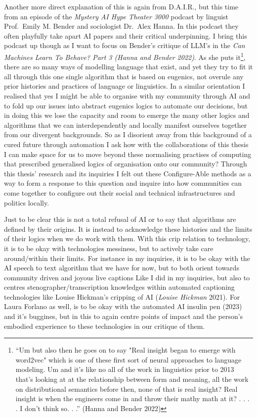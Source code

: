 Another more direct explanation of this is again from D.A.I.R., but this
time from an episode of the \emph{Mystery AI Hype Theater 3000} podcast
by linguist Prof.~Emily M. Bender and sociologist Dr.~Alex Hanna. In
this podcast they often playfully take apart AI papers and their
critical underpinning. I bring this podcast up though as I want to focus
on Bender's critique of LLM's in the \emph{Can Machines Learn To Behave?
Part 3 (Hanna and Bender 2022)}. As she puts it\footnote{``Um but also
  then he goes on to say "Real insight began to emerge with word2vec"
  which is one of these first sort of neural approaches to language
  modeling. Um and it's like no all of the work in linguistics prior to
  2013 that's looking at at the relationship between form and meaning,
  all the work on distributional semantics before then, none of that is
  real insight? Real insight is when the engineers come in and throw
  their mathy math at it? . . . . I don't think so. . .'' (Hanna and
  Bender 2022)}, there are so many ways of modelling language that
exist, and yet they try to fit it all through this one single algorithm
that is based on eugenics, not overule any prior histories and practices
of language or linguistics. In a similar orientation I realised that yes
I might be able to organise with my community through AI and to fold up
our issues into abstract eugenics logics to automate our decisions, but
in doing this we lose the capacity and room to emerge the many other
logics and algorithms that we can interdependently and locally manifest
ourselves together from our divergent backgrounds. So as I disorient
away from this background of a cured future through automation I ask how
with the collaborations of this thesis I can make space for us to move
beyond these normalising practises of computing that prescribed
generalised logics of organisation onto our community? Through this
thesis' research and its inquiries I felt out these Configure-Able
methods as a way to form a response to this question and inquire into
how communities can come together to configure out their social and
technical infrastructures and politics locally.

Just to be clear this is not a total refusal of AI or to say that
algorithms are defined by their origins. It is instead to acknowledge
these histories and the limits of their logics when we do work with
them. With this crip relation to technology, it is to be okay with
technologies messiness, but to actively take care around/within their
limits. For instance in my inquiries, it is to be okay with the AI
speech to text algorithm that we have for now, but to both orient
towards community driven and joyous live captions Like I did in my
inquiries, but also to centres stenographer/transcription knowledges
within automated captioning technologies like Louise Hickman's cripping
of AI (\emph{Louise Hickman} 2021). For Laura Forlano as well, is to be
okay with the automated AI insulin pen (2023) and it's buggines, but in
this to again centre points of impact and the person's embodied
experience to these technologies in our critique of them.


